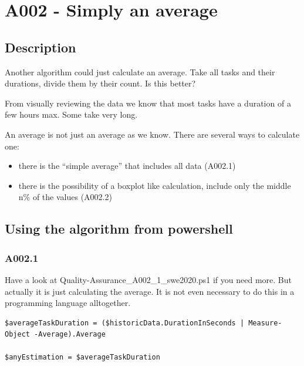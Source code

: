 \newpage{}
\newpage{}

\hypertarget{a002---simply-an-average}{%
\section{A002 - Simply an average}\label{a002---simply-an-average}}

\hypertarget{description}{%
\subsection{Description}\label{description}}

Another algorithm could just calculate an average. Take all tasks and
their durations, divide them by their count. Is this better?

From visually reviewing the data we know that most tasks have a duration
of a few hours max. Some take very long.

An average is not just an average as we know. There are several ways to
calculate one:

\begin{itemize}
\tightlist
\item
  there is the ``simple average'' that includes all data (A002.1)
\item
  there is the possibility of a boxplot like calculation, include only
  the middle n\% of the values (A002.2)
\end{itemize}

\hypertarget{using-the-algorithm-from-powershell}{%
\subsection{Using the algorithm from
powershell}\label{using-the-algorithm-from-powershell}}

\hypertarget{a002.1}{%
\subsubsection{A002.1}\label{a002.1}}

Have a look at Quality-Assurance\_A002\_1\_swe2020.ps1 if you need more.
But actually it is just calculating the average. It is not even
necessary to do this in a programming language alltogether.

\begin{verbatim}
$averageTaskDuration = ($historicData.DurationInSeconds | Measure-Object -Average).Average

$anyEstimation = $averageTaskDuration
\end{verbatim}


